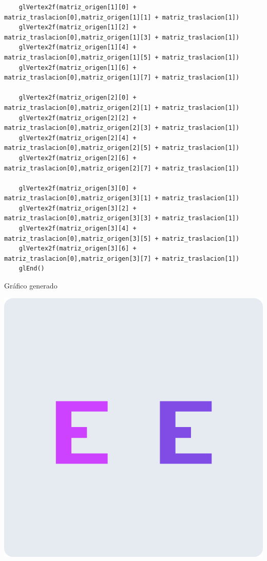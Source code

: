 \documentclass[a4paper]{article}
\begin{document}
\begin{center}
\begin{mycodeboxl}
\begin{lstlisting}
    glVertex2f(matriz_origen[1][0] + matriz_traslacion[0],matriz_origen[1][1] + matriz_traslacion[1])
    glVertex2f(matriz_origen[1][2] + matriz_traslacion[0],matriz_origen[1][3] + matriz_traslacion[1])
    glVertex2f(matriz_origen[1][4] + matriz_traslacion[0],matriz_origen[1][5] + matriz_traslacion[1])
    glVertex2f(matriz_origen[1][6] + matriz_traslacion[0],matriz_origen[1][7] + matriz_traslacion[1])
    
    glVertex2f(matriz_origen[2][0] + matriz_traslacion[0],matriz_origen[2][1] + matriz_traslacion[1])
    glVertex2f(matriz_origen[2][2] + matriz_traslacion[0],matriz_origen[2][3] + matriz_traslacion[1])
    glVertex2f(matriz_origen[2][4] + matriz_traslacion[0],matriz_origen[2][5] + matriz_traslacion[1])
    glVertex2f(matriz_origen[2][6] + matriz_traslacion[0],matriz_origen[2][7] + matriz_traslacion[1])

    glVertex2f(matriz_origen[3][0] + matriz_traslacion[0],matriz_origen[3][1] + matriz_traslacion[1])
    glVertex2f(matriz_origen[3][2] + matriz_traslacion[0],matriz_origen[3][3] + matriz_traslacion[1])
    glVertex2f(matriz_origen[3][4] + matriz_traslacion[0],matriz_origen[3][5] + matriz_traslacion[1])
    glVertex2f(matriz_origen[3][6] + matriz_traslacion[0],matriz_origen[3][7] + matriz_traslacion[1])
    glEnd()

\end{lstlisting}
\end{mycodeboxl}
\end{center}
\newpage
Gráfico generado 
\begin{center}
\includegraphics[width=16cm]{src/3.png}
\end{center}
\newpage
\end{document}
